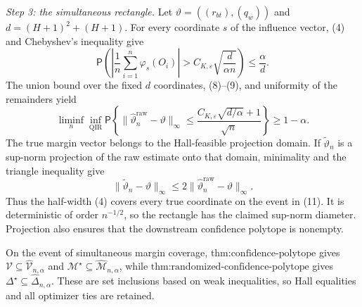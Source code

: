 \emph{Step 3: the simultaneous rectangle.}
Let \(\vartheta=((r_{bt}),(q_w))\) and \(d=(H+1)^2+(H+1)\).  For every coordinate \(s\) of the influence vector, (4) and Chebyshev's inequality give
\[
 \mathsf P\!\left(
 \left|\frac1n\sum_{i=1}^n\varphi_s(O_i)\right|
 >C_{K,\varepsilon}\sqrt{\frac d{\alpha n}}\right)
 \le\frac\alpha d.                                      \tag{10}
\]
The union bound over the fixed \(d\) coordinates, (8)--(9), and uniformity of the remainders yield
\[
 \liminf_n\inf_{\operatorname{QIR}}
 \mathsf P\!\left\{
 \lVert\widehat\vartheta_n^{\mathrm{raw}}-\vartheta\rVert_\infty
 \le\frac{C_{K,\varepsilon}\sqrt{d/\alpha}+1}{\sqrt n}
 \right\}\ge1-\alpha.                                  \tag{11}
\]
The true margin vector belongs to the Hall-feasible projection domain.  If \(\widetilde\vartheta_n\) is a sup-norm projection of the raw estimate onto that domain, minimality and the triangle inequality give
\[
 \lVert\widetilde\vartheta_n-\vartheta\rVert_\infty
 \le2\lVert\widehat\vartheta_n^{\mathrm{raw}}-\vartheta\rVert_\infty. \tag{12}
\]
Thus the half-width (4) covers every true coordinate on the event in (11).  It is deterministic of order \(n^{-1/2}\), so the rectangle has the claimed sup-norm diameter.  Projection also ensures that the downstream confidence polytope is nonempty.

On the event of simultaneous margin coverage, \(\text{thm:confidence-polytope}\) gives
\(\mathcal V\subseteq\widehat{\mathcal V}_{n,\alpha}\) and
\(\mathcal M^\star\subseteq\widehat{\mathcal M}_{n,\alpha}\), while
\(\text{thm:randomized-confidence-polytope}\) gives
\(\Delta^\star\subseteq\widehat\Delta_{n,\alpha}\).  These are set inclusions based on weak inequalities, so Hall equalities and all optimizer ties are retained.

